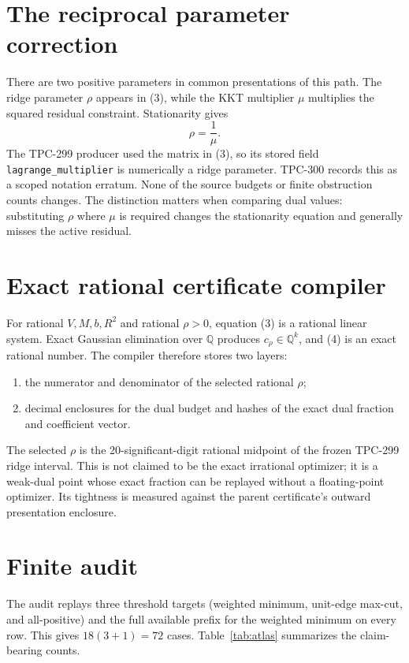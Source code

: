 \documentclass[11pt]{article}
\newcommand{\Q}{\mathbb{Q}}
\begin{document}
\section{The reciprocal parameter correction}

There are two positive parameters in common presentations of this path.
The ridge parameter $\rho$ appears in (3), while the KKT multiplier $\mu$
multiplies the squared residual constraint.  Stationarity gives
\[
 \rho=\frac1\mu.                                             \tag{7}
\]
The TPC-299 producer used the matrix in (3), so its stored field
\texttt{lagrange\_multiplier} is numerically a ridge parameter.  TPC-300
records this as a scoped notation erratum.  None of the source budgets or
finite obstruction counts changes.  The distinction matters when comparing
dual values: substituting $\rho$ where $\mu$ is required changes the
stationarity equation and generally misses the active residual.

\section{Exact rational certificate compiler}

For rational $V,M,b,R^2$ and rational $\rho>0$, equation (3) is a rational
linear system.  Exact Gaussian elimination over $\Q$ produces
$c_\rho\in\Q^k$, and (4) is an exact rational number.  The compiler therefore
stores two layers:

\begin{enumerate}
\item the numerator and denominator of the selected rational $\rho$;
\item decimal enclosures for the dual budget and hashes of the exact dual
fraction and coefficient vector.
\end{enumerate}

The selected $\rho$ is the 20-significant-digit rational midpoint of the
frozen TPC-299 ridge interval.  This is not claimed to be the exact
irrational optimizer; it is a weak-dual point whose exact fraction can be
replayed without a floating-point optimizer.  Its tightness is measured
against the parent certificate's outward presentation enclosure.

\section{Finite audit}

The audit replays three threshold targets (weighted minimum, unit-edge
max-cut, and all-positive) and the full available prefix for the weighted
minimum on every row.  This gives $18(3+1)=72$ cases.  Table~\ref{tab:atlas}
summarizes the claim-bearing counts.
\end{document}
